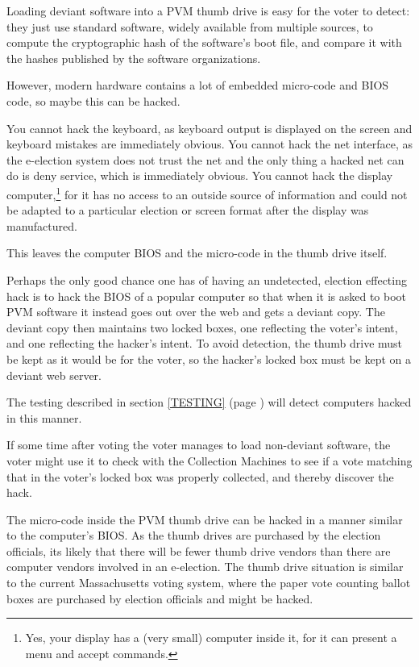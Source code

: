 \documentclass[12pt]{article}
\begin{document}
Loading deviant software into a PVM thumb drive is easy
for the voter to detect: they just use standard software,
widely available from multiple sources, to compute
the cryptographic hash of the software's boot file, and
compare it with the hashes published by the software
organizations.

However, modern hardware contains a lot of embedded micro-code and
BIOS code, so maybe this can be hacked.

You cannot hack the keyboard, as keyboard output is displayed on
the screen and keyboard mistakes are immediately obvious.  You
cannot hack the net interface, as the e-election system does not
trust the net and the only thing a hacked net can do is deny
service, which is immediately obvious.  You cannot hack the
display computer,\footnote{Yes, your display has a (very small)
computer inside it, for it can present a menu and accept commands.}
for it has no access to an outside source of
information and could not be adapted to a particular election
or screen format after the display was manufactured.

This leaves the computer BIOS and the micro-code in the thumb
drive itself.

Perhaps the only good chance one has of having an undetected, 
election effecting hack is to hack the BIOS of a popular computer
so that when it is asked to boot PVM software it instead goes out
over the web and gets a deviant copy.  The deviant copy then maintains
two locked boxes, one reflecting the voter's intent, and one reflecting
the hacker's intent.  To avoid detection, the thumb drive must be
kept as it would be for the voter, so the hacker's locked box must
be kept on a deviant web server.

The testing described in section \ref{TESTING} (page \pageref{TESTING})
will detect computers hacked in this manner.

If some time after voting the voter manages to load non-deviant
software, the voter might use it to check with the Collection
Machines to see if a vote matching that in the voter's locked box
was properly collected, and thereby discover the hack.

The micro-code inside the PVM thumb drive can be hacked
in a manner similar to the computer's BIOS.  As the thumb drives
are purchased by the election officials, its likely that there
will be fewer thumb drive vendors than there are computer vendors
involved in an e-election.
The thumb drive situation is similar to the current
Massachusetts voting system, where the paper vote counting ballot boxes
are purchased by election officials and might be hacked.
\end{document}
